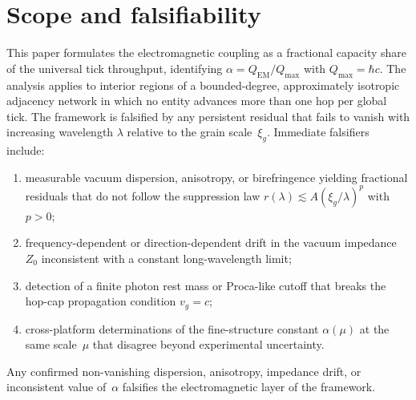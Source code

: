 \section*{Scope and falsifiability}
This paper formulates the electromagnetic coupling as a fractional
capacity share of the universal tick throughput, identifying
\(\alpha = Q_{\mathrm{EM}}/Q_{\max}\) with \(Q_{\max} = \hbar c\).
The analysis applies to interior regions of a bounded-degree,
approximately isotropic adjacency network in which no entity advances
more than one hop per global tick.  The framework is falsified by any
persistent residual that fails to vanish with increasing wavelength
\(\lambda\) relative to the grain scale~\(\xi_g\).  Immediate falsifiers include:
\begin{enumerate}[label=(\roman*)]
  \item measurable vacuum dispersion, anisotropy, or birefringence
        yielding fractional residuals that do not follow the suppression
        law \(r(\lambda)\!\lesssim\!A(\xi_g/\lambda)^{p}\) with \(p>0\);
  \item frequency-dependent or direction-dependent drift in the vacuum
        impedance \(Z_{0}\) inconsistent with a constant long-wavelength
        limit;
  \item detection of a finite photon rest mass or Proca-like cutoff that
        breaks the hop-cap propagation condition \(v_{g}=c\);
  \item cross-platform determinations of the fine-structure constant
        \(\alpha(\mu)\) at the same scale~\(\mu\) that disagree beyond
        experimental uncertainty.
\end{enumerate}
Any confirmed non-vanishing dispersion, anisotropy, impedance drift, or
inconsistent value of~\(\alpha\) falsifies the electromagnetic layer of the
framework.
